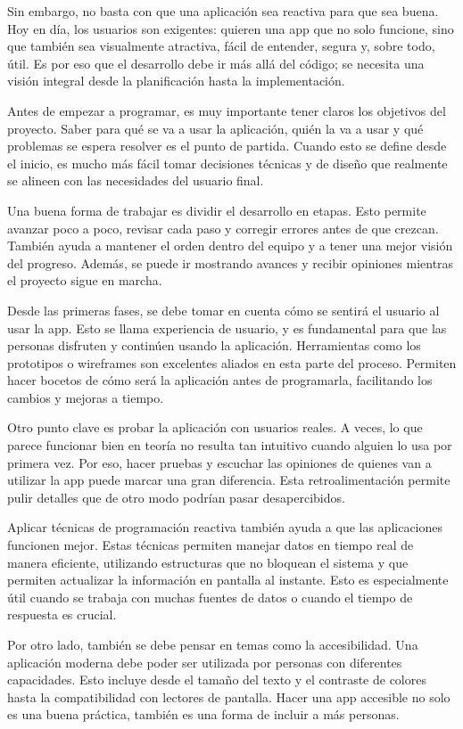 \documentclass[12pt,letterpaper]{article}
\begin{document}
Sin embargo, no basta con que una aplicación sea reactiva para que sea buena. Hoy en día, los usuarios son exigentes: quieren una app que no solo funcione, sino que también sea visualmente atractiva, fácil de entender, segura y, sobre todo, útil. Es por eso que el desarrollo debe ir más allá del código; se necesita una visión integral desde la planificación hasta la implementación.

Antes de empezar a programar, es muy importante tener claros los objetivos del proyecto. Saber para qué se va a usar la aplicación, quién la va a usar y qué problemas se espera resolver es el punto de partida. Cuando esto se define desde el inicio, es mucho más fácil tomar decisiones técnicas y de diseño que realmente se alineen con las necesidades del usuario final.

Una buena forma de trabajar es dividir el desarrollo en etapas. Esto permite avanzar poco a poco, revisar cada paso y corregir errores antes de que crezcan. También ayuda a mantener el orden dentro del equipo y a tener una mejor visión del progreso. Además, se puede ir mostrando avances y recibir opiniones mientras el proyecto sigue en marcha.

Desde las primeras fases, se debe tomar en cuenta cómo se sentirá el usuario al usar la app. Esto se llama experiencia de usuario, y es fundamental para que las personas disfruten y continúen usando la aplicación. Herramientas como los prototipos o wireframes son excelentes aliados en esta parte del proceso. Permiten hacer bocetos de cómo será la aplicación antes de programarla, facilitando los cambios y mejoras a tiempo.

Otro punto clave es probar la aplicación con usuarios reales. A veces, lo que parece funcionar bien en teoría no resulta tan intuitivo cuando alguien lo usa por primera vez. Por eso, hacer pruebas y escuchar las opiniones de quienes van a utilizar la app puede marcar una gran diferencia. Esta retroalimentación permite pulir detalles que de otro modo podrían pasar desapercibidos.

Aplicar técnicas de programación reactiva también ayuda a que las aplicaciones funcionen mejor. Estas técnicas permiten manejar datos en tiempo real de manera eficiente, utilizando estructuras que no bloquean el sistema y que permiten actualizar la información en pantalla al instante. Esto es especialmente útil cuando se trabaja con muchas fuentes de datos o cuando el tiempo de respuesta es crucial.

Por otro lado, también se debe pensar en temas como la accesibilidad. Una aplicación moderna debe poder ser utilizada por personas con diferentes capacidades. Esto incluye desde el tamaño del texto y el contraste de colores hasta la compatibilidad con lectores de pantalla. Hacer una app accesible no solo es una buena práctica, también es una forma de incluir a más personas.
\end{document}
